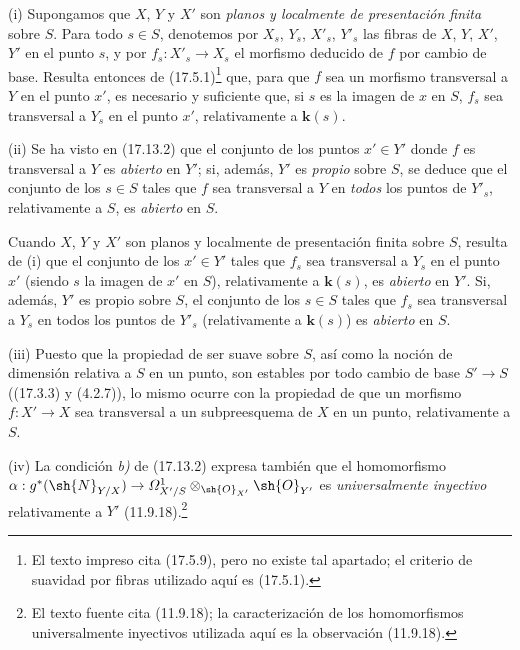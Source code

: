 \begin{remarks}[17.13.4]
\label{IV.17.13.4}
(i) Supongamos que $X$, $Y$ y $X'$ son \emph{planos y localmente de presentación finita} sobre $S$. Para todo $s\in S$, denotemos por $X_s$, $Y_s$, $X'_s$, $Y'_s$ las fibras de $X$, $Y$, $X'$, $Y'$ en el punto $s$, y por $f_s:X'_s\to X_s$ el morfismo deducido de $f$ por cambio de base. Resulta entonces de (17.5.1)\footnote{El texto impreso cita (17.5.9), pero no existe tal apartado; el criterio de suavidad por fibras utilizado aquí es (17.5.1).} que, para que $f$ sea un morfismo transversal a $Y$ en el punto $x'$, es necesario y suficiente que, si $s$ es la imagen de $x$ en $S$, $f_s$ sea transversal a $Y_s$ en el punto $x'$, relativamente a $\boldsymbol{k}(s)$.

(ii) Se ha visto en (17.13.2) que el conjunto de los puntos $x'\in Y'$ donde $f$ es transversal a $Y$ es \emph{abierto} en $Y'$; si, además, $Y'$ es \emph{propio} sobre $S$, se deduce que el conjunto de los $s\in S$ tales que $f$ sea transversal a $Y$ en \emph{todos} los puntos de $Y'_s$, relativamente a $S$, es \emph{abierto} en $S$.

Cuando $X$, $Y$ y $X'$ son planos y localmente de presentación finita sobre $S$, resulta de (i) que el conjunto de los $x'\in Y'$ tales que $f_s$ sea transversal a $Y_s$ en el punto $x'$ (siendo $s$ la imagen de $x'$ en $S$), relativamente a $\boldsymbol{k}(s)$, es \emph{abierto} en $Y'$. Si, además, $Y'$ es propio sobre $S$, el conjunto de los $s\in S$ tales que $f_s$ sea transversal a $Y_s$ en todos los puntos de $Y'_s$ (relativamente a $\boldsymbol{k}(s)$) es \emph{abierto} en $S$.

(iii) Puesto que la propiedad de ser suave sobre $S$, así como la noción de dimensión relativa a $S$ en un punto, son estables por todo cambio de base $S'\to S$ ((17.3.3) y (4.2.7)), lo mismo ocurre con la propiedad de que un morfismo $f:X'\to X$ sea transversal a un subpreesquema de $X$ en un punto, relativamente a $S$.


(iv) La condición \emph{b)} de (17.13.2) expresa también que el homomorfismo $\alpha:g^*(\sh{N}_{Y/X})\to\varOmega^1_{X'/S}\otimes_{\sh{O}_{X'}}\sh{O}_{Y'}$ es \emph{universalmente inyectivo} relativamente a $Y'$ (11.9.18).\footnote{El texto fuente cita (11.9.18); la caracterización de los homomorfismos universalmente inyectivos utilizada aquí es la observación (11.9.18).}
\end{remarks}

